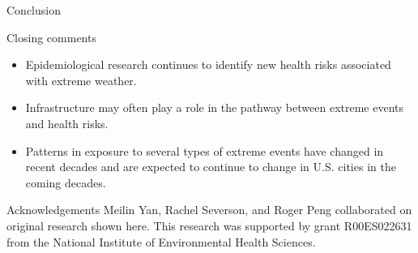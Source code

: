 \documentclass[ignorenonframetext,]{beamer}
\begin{document}
\begin{frame}{Conclusion}

\begin{block}{Closing comments}
\begin{itemize}
  \item Epidemiological research continues to identify new health risks associated with extreme weather. 
  \item Infrastructure may often play a role in the pathway between extreme events and health risks.
  \item Patterns in exposure to several types of extreme events have changed in recent decades and are expected to continue to change in U.S. cities in the coming decades.
\end{itemize}
\end{block}

\begin{block}{Acknowledgements}
\small Meilin Yan, Rachel Severson, and Roger Peng collaborated on original research shown here. This research was supported by grant R00ES022631 from the National Institute of Environmental Health Sciences. 
\end{block}

\end{frame}
\end{document}
